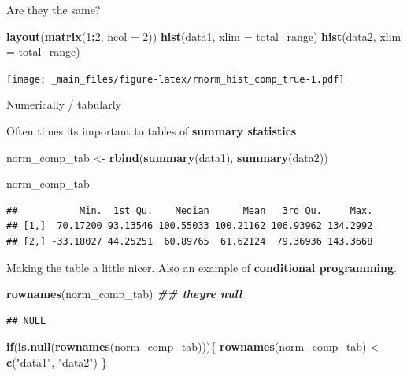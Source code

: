 \documentclass[
]{book}
\newenvironment{Shaded}{\begin{snugshade}}{\end{snugshade}}
\newcommand{\AttributeTok}[1]{\textcolor[rgb]{0.13,0.29,0.53}{#1}}
\newcommand{\ControlFlowTok}[1]{\textcolor[rgb]{0.13,0.29,0.53}{\textbf{#1}}}
\newcommand{\DecValTok}[1]{\textcolor[rgb]{0.00,0.00,0.81}{#1}}
\newcommand{\DocumentationTok}[1]{\textcolor[rgb]{0.56,0.35,0.01}{\textbf{\textit{#1}}}}
\newcommand{\FunctionTok}[1]{\textcolor[rgb]{0.13,0.29,0.53}{\textbf{#1}}}
\newcommand{\NormalTok}[1]{#1}
\newcommand{\OtherTok}[1]{\textcolor[rgb]{0.56,0.35,0.01}{#1}}
\newcommand{\SpecialCharTok}[1]{\textcolor[rgb]{0.81,0.36,0.00}{\textbf{#1}}}
\newcommand{\StringTok}[1]{\textcolor[rgb]{0.31,0.60,0.02}{#1}}
\begin{document}
Are they the same?

\begin{Shaded}
\begin{Highlighting}[]
\FunctionTok{layout}\NormalTok{(}\FunctionTok{matrix}\NormalTok{(}\DecValTok{1}\SpecialCharTok{:}\DecValTok{2}\NormalTok{, }\AttributeTok{ncol =} \DecValTok{2}\NormalTok{))}
\FunctionTok{hist}\NormalTok{(data1, }\AttributeTok{xlim =}\NormalTok{ total\_range)}
\FunctionTok{hist}\NormalTok{(data2, }\AttributeTok{xlim =}\NormalTok{ total\_range)}
\end{Highlighting}
\end{Shaded}

\texttt{[image: \_main\_files/figure-latex/rnorm\_hist\_comp\_true-1.pdf]}

Numerically / tabularly

Often times its important to tables of \textbf{summary statistics}

\begin{Shaded}
\begin{Highlighting}[]
\NormalTok{norm\_comp\_tab }\OtherTok{\textless{}{-}} \FunctionTok{rbind}\NormalTok{(}\FunctionTok{summary}\NormalTok{(data1),}
                       \FunctionTok{summary}\NormalTok{(data2))}

\NormalTok{norm\_comp\_tab}
\end{Highlighting}
\end{Shaded}

\begin{verbatim}
##           Min.  1st Qu.    Median      Mean   3rd Qu.     Max.
## [1,]  70.17200 93.13546 100.55033 100.21162 106.93962 134.2992
## [2,] -33.18027 44.25251  60.89765  61.62124  79.36936 143.3668
\end{verbatim}

Making the table a little nicer. Also an example of \textbf{conditional programming}.

\begin{Shaded}
\begin{Highlighting}[]
\FunctionTok{rownames}\NormalTok{(norm\_comp\_tab) }\DocumentationTok{\#\# they\textquotesingle{}re null}
\end{Highlighting}
\end{Shaded}

\begin{verbatim}
## NULL
\end{verbatim}

\begin{Shaded}
\begin{Highlighting}[]
\ControlFlowTok{if}\NormalTok{(}\FunctionTok{is.null}\NormalTok{(}\FunctionTok{rownames}\NormalTok{(norm\_comp\_tab)))\{}
  \FunctionTok{rownames}\NormalTok{(norm\_comp\_tab) }\OtherTok{\textless{}{-}} \FunctionTok{c}\NormalTok{(}\StringTok{"data1"}\NormalTok{, }\StringTok{"data2"}\NormalTok{)}
\NormalTok{\}}
\end{Highlighting}
\end{Shaded}
\end{document}
